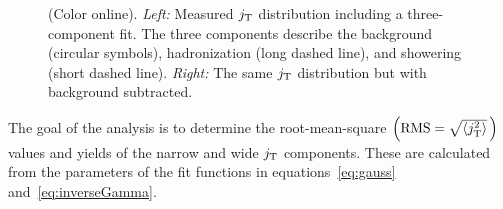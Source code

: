   \begin{figure}
    \begin{center}
    \end{center}
    \caption{(Color online). \emph{Left:} Measured $j_{\rm T}$ distribution including a three-component fit. The three components describe the background (circular symbols), hadronization (long dashed line), and showering (short dashed line). \emph{Right:} The same $j_{\rm T}$ distribution but with background subtracted.}
    \label{fig:jtdistribution}
  \end{figure}

The goal of the analysis is to determine the root-mean-square $\left(\text{RMS} = \sqrt{\left<j_{\rm T}^2\right>}\,\right)$ values and yields of the narrow and wide $j_{\rm T}$ components. These are calculated from the parameters of the fit functions in equations~\eqref{eq:gauss} and~\eqref{eq:inverseGamma}.

